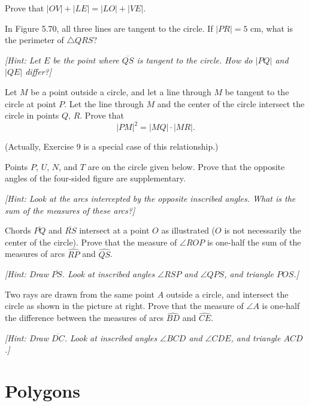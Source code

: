 \documentclass[12pt]{book} %
\begin{document}
\begin{ExerciseList}

Prove that $|OV|+|LE|=|LO|+|VE|$.

\Exercise In Figure 5.70, all three lines are tangent to the circle. If $|PR|=5$ cm, what is the perimeter of $\triangle QRS$?


\textit{[Hint: Let $E$ be the point where $\overline{QS}$ is tangent to the circle. How do $|PQ|$ and $|QE|$ differ?]}

\Exercise Let $M$ be a point outside a circle, and let a line through $M$ be tangent to the circle at point $P$. Let the line through $M$ and the center of the circle intersect the circle in points $Q$, $R$. Prove that
\[
|PM|^2=|MQ|\cdot|MR|.
\]


(Actually, Exercise 9 is a special case of this relationship.)

\Exercise Points $P$, $U$, $N$, and $T$ are on the circle given below. Prove that the opposite angles of the four-sided figure are supplementary.


\textit{[Hint: Look at the arcs intercepted by the opposite inscribed angles. What is the sum of the measures of these arcs?]}

\Exercise Chords $\overline{PQ}$ and $\overline{RS}$ intersect at a point $O$ as illustrated ($O$ is not necessarily the center of the circle). Prove that the measure of $\angle ROP$ is one-half the sum of the measures of arcs $\widehat{RP}$ and $\widehat{QS}$.


\textit{[Hint: Draw $\overline{PS}$. Look at inscribed angles $\angle RSP$ and $\angle QPS$, and triangle $POS$.]}

\Exercise Two rays are drawn from the same point $A$ outside a circle, and intersect the circle as shown in the picture at right. Prove that the measure of $\angle A$ is one-half the difference between the measures of arcs $\widehat{BD}$ and $\widehat{CE}$.


\textit{[Hint: Draw $\overline{DC}$. Look at inscribed angles $\angle BCD$ and $\angle CDE$, and triangle $ACD$.]}
\end{ExerciseList}

\chapter{Polygons}
\end{document}

